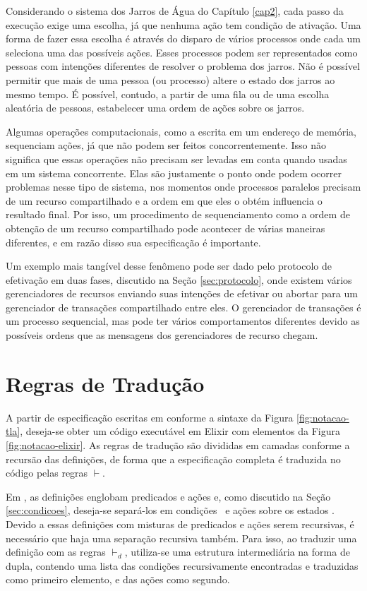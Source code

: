 Considerando o sistema dos Jarros de Água do Capítulo \ref{cap2}, cada passo da
execução exige uma escolha, já que nenhuma ação tem condição de ativação. Uma
forma de fazer essa escolha é através do disparo de vários processos onde cada
um seleciona uma das possíveis ações. Esses processos podem ser representados
como pessoas com intenções diferentes de resolver o problema dos jarros. Não é
possível permitir que mais de uma pessoa (ou processo) altere o estado dos
jarros ao mesmo tempo. É possível, contudo, a partir de uma fila ou de uma
escolha aleatória de pessoas, estabelecer uma ordem de ações sobre os jarros.

Algumas operações computacionais, como a escrita em um endereço de memória,
sequenciam ações, já que não podem ser feitos concorrentemente. Isso não
significa que essas operações não precisam ser levadas em conta quando usadas em
um sistema concorrente. Elas são justamente o ponto onde podem ocorrer problemas
nesse tipo de sistema, nos momentos onde processos paralelos precisam de um
recurso compartilhado e a ordem em que eles o obtém influencia o resultado
final. Por isso, um procedimento de sequenciamento como a ordem de obtenção de um
recurso compartilhado pode acontecer de várias maneiras diferentes, e em razão
disso sua especificação é importante.

Um exemplo mais tangível desse fenômeno pode ser dado pelo protocolo de
efetivação em duas fases, discutido na Seção \ref{sec:protocolo}, onde existem vários gerenciadores de recursos
enviando suas intenções de efetivar ou abortar para um gerenciador de transações
compartilhado entre eles. O gerenciador de transações é um processo sequencial,
mas pode ter vários comportamentos diferentes devido as possíveis ordens que as
mensagens dos gerenciadores de recurso chegam.

\section{Regras de Tradução}
\label{sec:regras}

A partir de especificação escritas em \TLAA conforme a sintaxe da Figura
\ref{fig:notacao-tla}, deseja-se obter um código executável em Elixir com
elementos da Figura \ref{fig:notacao-elixir}. As regras de tradução são
divididas em camadas conforme a recursão das definições, de forma que a
especificação completa é traduzida no código pelas regras $\vdash$.



Em \TLAA, as definições \FANCYA englobam predicados e ações e, como discutido na
Seção \ref{sec:condicoes}, deseja-se separá-los em condições \ttc\ e ações sobre
os estados \tta. Devido a essas definições com misturas de predicados e ações
serem recursivas, é necessário que haja uma separação recursiva também. Para
isso, ao traduzir uma definição com as regras $\vdash_d$, utiliza-se uma
estrutura intermediária na forma de dupla, contendo uma lista das condições
recursivamente encontradas e traduzidas como primeiro elemento, e das ações como
segundo.

